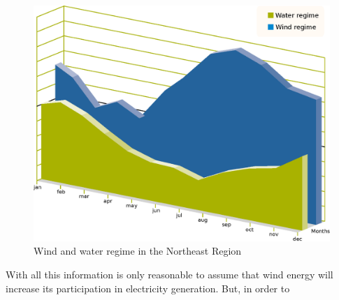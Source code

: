 \begin{figure}
	\caption{Wind and water regime in the Northeast Region}
	\begin{center}
		\includegraphics[scale=0.5]{Images/WindWater.eps}
	\end{center}
	\label{fig: WindRiver}
\end{figure}

With all this information is only reasonable to assume that wind energy will increase its participation in electricity generation. But, in order to 
